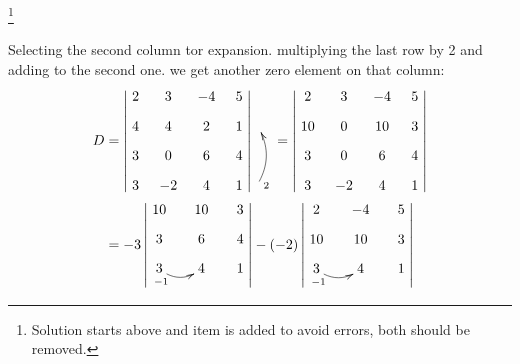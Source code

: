 \documentclass[11pt]{amsbook}
\begin{document}
    \begin{hEnumerateArabic}
    \item[]
    \begin{hSolution}\footnote{Solution starts above and item is added to avoid errors, both should be removed.}
    \par Selecting the second column tor expansion. multiplying the last row by 2 and adding to the second one. we get another zero element on that column:
    \begin{align*}
        D &= 
        \begin{vmatrix}
            \xymatrix @R=3mm @C=3mm {
                 2 &  3 & -4 & 5 \\
                 4 &  4 &  2 & 1 \\
                 3 &  0 &  6 & 4 \\
                 3 & -2 &  4 & 1 
            }
        \end{vmatrix}
        \begin{matrix}
            \xymatrix @R=5mm {
                \\ \\ \\ \ar@/_/[uu]_<2
            }
        \end{matrix}
        =
        \begin{vmatrix}
            \xymatrix @R=3mm @C=3mm {
                 2 &  3 & -4 &  5 \\
                10 &  0 & 10 &  3 \\
                 3 &  0 &  6 &  4 \\
                 3 & -2 &  4 &  1
            }
        \end{vmatrix}
        \\%
        &= -3
        \begin{vmatrix}
            \xymatrix @R=3mm @C=5mm {
                10 & 10 &  3 \\
                 3 &  6 &  4 \\
                 3 \ar@/_/[r]_<{-1} &  4 &  1
            }
        \end{vmatrix}
        -(-2)
        \begin{vmatrix}
            \xymatrix @R=3mm @C=5mm {
                 2 & -4 &  5 \\
                10 & 10 &  3 \\
                 3 \ar@/_/[r]_<{-1} &  4 &  1
            }
        \end{vmatrix}

\end{align*}
\end{hSolution}
\end{hEnumerateArabic}
\end{document}
